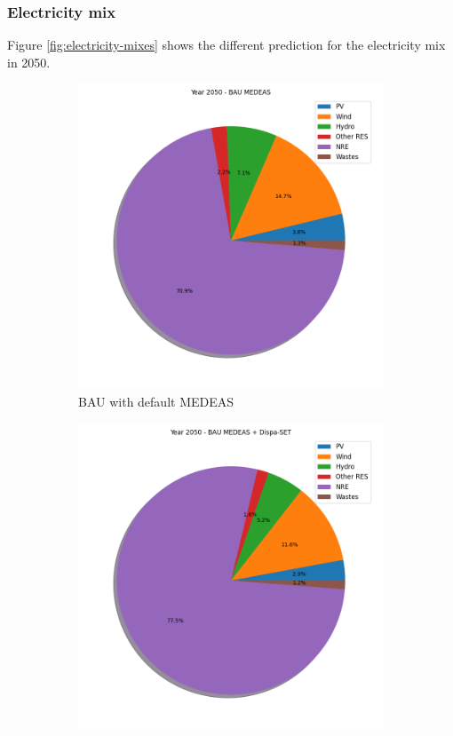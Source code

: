 \subsubsection{Electricity mix}

Figure \ref{fig:electricity-mixes} shows the different prediction for the electricity mix in 2050.

\begin{figure}[h]
    \centering
    \begin{subfigure}{0.34\textwidth}
        \includegraphics[width=\textwidth]{resources/images/electricity-mix-BAU-default.png}
        \caption{BAU with default MEDEAS}
        \label{fig:electricity-mix-BAU-def}
    \end{subfigure}
    \begin{subfigure}{0.34\textwidth}
        \includegraphics[width=\textwidth]{resources/images/electricity-mix-BAU-dispa.png}

\end{subfigure}
\end{figure}
